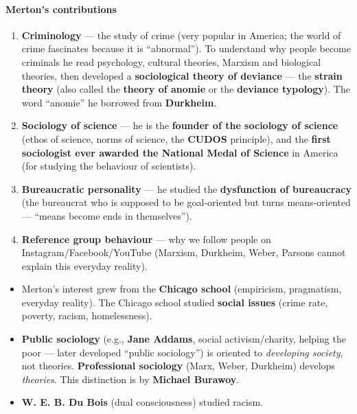 \paragraph{Merton's contributions}
\begin{enumerate}
\item \textbf{Criminology} --- the study of crime (very popular in America; the world of crime fascinates because it is ``abnormal''). To understand why people become criminals he read psychology, cultural theories, Marxism and biological theories, then developed a \textbf{sociological theory of deviance} --- the \textbf{strain theory} (also called the \textbf{theory of anomie} or the \textbf{deviance typology}). The word ``anomie'' he borrowed from \textbf{Durkheim}.
\item \textbf{Sociology of science} --- he is the \textbf{founder of the sociology of science} (ethos of science, norms of science, the \textbf{CUDOS} principle), and the \textbf{first sociologist ever awarded the National Medal of Science} in America (for studying the behaviour of scientists).
\item \textbf{Bureaucratic personality} --- he studied the \textbf{dysfunction of bureaucracy} (the bureaucrat who is supposed to be goal-oriented but turns means-oriented --- ``means become ends in themselves'').
\item \textbf{Reference group behaviour} --- why we follow people on Instagram/Facebook/YouTube (Marxism, Durkheim, Weber, Parsons cannot explain this everyday reality).
\end{enumerate}

\begin{CriticalPoint}
\begin{itemize}
\item Merton's interest grew from the \textbf{Chicago school} (empiricism, pragmatism, everyday reality). The Chicago school studied \textbf{social issues} (crime rate, poverty, racism, homelessness).
\item \textbf{Public sociology} (e.g., \textbf{Jane Addams}, social activism/charity, helping the poor --- later developed ``public sociology'') is oriented to \textit{developing society}, not theories. \textbf{Professional sociology} (Marx, Weber, Durkheim) develops \textit{theories}. This distinction is by \textbf{Michael Burawoy}.
\item \textbf{W. E. B. Du Bois} (dual consciousness) studied racism.
\end{itemize}
\end{CriticalPoint}

